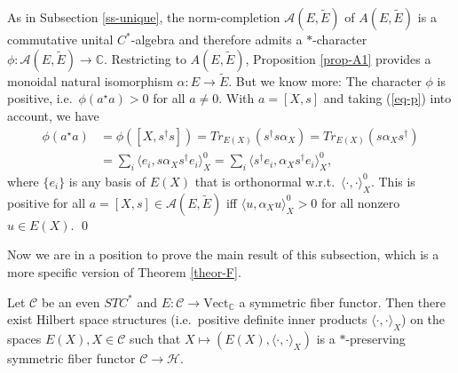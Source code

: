 \documentclass[12pt]{article}
\theoremstyle{definition}
\theoremstyle{definition}
\theoremstyle{remark}
\newcommand{\Vect}{\mathrm{Vect}}
\def\2#1{{\mathcal #1}}
\def\7#1{{\mathbb #1}}
\newcommand{\rarr}{\rightarrow}
\begin{document}
\prf As in Subsection \ref{ss-unique}, the norm-completion
$\2A(E,\widetilde{E})$ of $A(E,\widetilde{E})$ is a commutative unital
$C^*$-algebra and therefore admits a $*$-character
$\phi:\2A(E,\widetilde{E})\rarr\7C$. Restricting to
$A(E,\widetilde{E})$, Proposition \ref{prop-A1} provides a monoidal
natural isomorphism $\alpha:E\rarr\widetilde{E}$. But we know more:
The character $\phi$ is positive, i.e.\ $\phi(a^\star a)>0$ for all
$a\ne 0$. With $a=[X,s]$ and taking (\ref{eq-p}) into account, we have
\[ \begin{aligned} \phi(a^\star a) &=\phi([X,s^\dagger s])=Tr_{E(X)}(s^\dagger s\alpha_X)=Tr_{E(X)}(s\alpha_Xs^\dagger)
  \\
&= \sum_i \langle e_i, s\alpha_X s^\dagger e_i\rangle_X^0 =\sum_i \langle s^\dagger e_i, \alpha_X
  s^\dagger e_i\rangle_X^0, \end{aligned} \]
where $\{e_i\}$ is any basis of $E(X)$ that is orthonormal w.r.t.\ $\langle\cdot,\cdot\rangle_X^0$.
This is positive for all $a=[X,s]\in\2A(E,\widetilde{E})$ iff $\langle u,\alpha_Xu\rangle_X^0>0$ for
all nonzero $u\in E(X)$. 
\qed

Now we are in a position to prove the main result of this subsection, which is a more specific
version of Theorem \ref{theor-F}.

\btheor \label{theor-starfunc} Let $\2C$ be an even $STC^*$ and
$E:\2C\rarr\Vect_\7C$ a symmetric fiber functor. Then there exist
Hilbert space structures (i.e.\ positive definite inner products
$\langle\cdot,\cdot\rangle_X$) on the spaces $E(X),X\in\2C$ such that
$X\mapsto (E(X),\langle\cdot,\cdot\rangle_X)$ is a $*$-preserving
symmetric fiber functor $\2C\rarr\2H$.  \etheor
\end{document}
